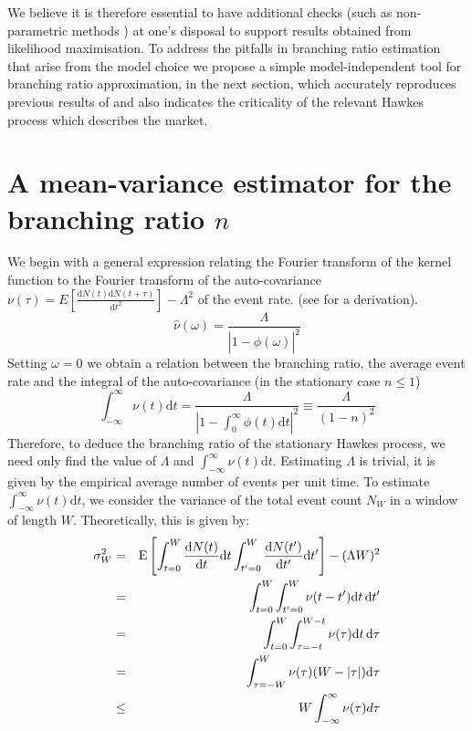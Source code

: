 \documentclass{article}
\begin{document}
We believe it is therefore essential to have additional checks (such as
non-parametric methods {\cite{bacry}}) at one's disposal to support results
obtained from likelihood maximisation. To address the pitfalls in branching
ratio estimation that arise from the model choice we propose a simple
model-independent tool for branching ratio approximation, in the next section,
which accurately reproduces previous results of {\cite{filimonov}} and also
indicates the criticality of the relevant Hawkes process which describes the
market.

\section{A mean-variance estimator for the branching ratio $n$}

We begin with a general expression relating the Fourier transform of the
kernel function to the Fourier transform of the auto-covariance $\nu (\tau) =
E [\frac{\mathrm{d} N (t) \mathrm{d} N (t + \tau)}{\mathrm{d} t^2}] -
\Lambda^2$ of the event rate. (see {\cite{hawkes,bacry}} for a derivation).
\begin{equation}
  \hat{\nu} (\omega) = \frac{\Lambda}{| 1 - \hat{\phi} (\omega) |^2}
\end{equation}
Setting $\omega = 0$ we obtain a relation between the branching ratio, the
average event rate and the integral of the auto-covariance (in the stationary
case $n \leq 1$)
\begin{equation}
  \label{basic} \int_{- \infty}^{\infty} \nu (t) \mathrm{d} t =
  \frac{\Lambda}{\left| 1 - \int_0^{\infty} \phi (t) \mathrm{d} t \right|^2}
  \equiv \frac{\Lambda}{(1 - n)^2}
\end{equation}
Therefore, to deduce the branching ratio of the stationary Hawkes process, we
need only find the value of $\Lambda$ and $\int_{- \infty}^{\infty} \nu (t)
\mathrm{d} t$. Estimating $\Lambda$ is trivial, it is given by the empirical
average number of events per unit time. To estimate $\int_{- \infty}^{\infty}
\nu (t) \mathrm{d} t$, we consider the variance of the total event count $N_W$
in a window of length $W$. Theoretically, this is given by:
\begin{eqnarray}
  \sigma^2_W & = & \mathrm{E} \left[ \int_{t = 0}^W \frac{\mathrm{d} N
  (t)}{\mathrm{d} t} \mathrm{d} t \int_{t' = 0}^W \frac{\mathrm{d} N
  (t')}{\mathrm{d} t'} \mathrm{d} t' \right] - (\Lambda W)^2 \nonumber\\
  & = & \int_{t = 0}^W \int_{t' = 0}^W \nu (t - t') \mathrm{d} t
  \hspace{0.17em} \mathrm{d} t' \nonumber\\
  & = & \int_{t = 0}^W \int_{\tau = - t}^{W - t} \nu (\tau) \mathrm{d} t
  \hspace{0.17em} \mathrm{d} \tau \nonumber\\
  & = & \int_{\tau = - W}^W \nu (\tau)  (W - | \tau |) \mathrm{d} \tau
  \nonumber\\
  & \leq & W \int_{- \infty}^{\infty} \nu (\tau) d \tau  \label{eq:bounded}
\end{eqnarray}
\end{document}
